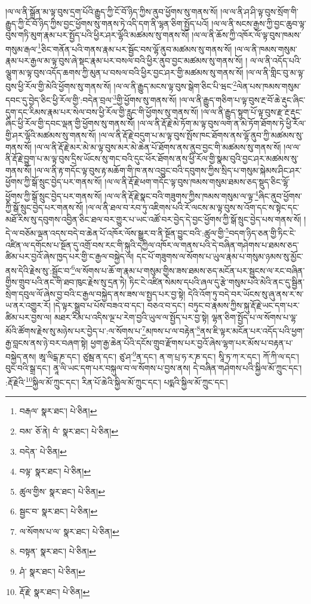 །ལ་ལ་ནི་སྒྲོན་མ་ལྟ་བུས་དྲག་པོའི་རྒྱུད་ཀྱི་ངོ་བོ་ཉིད་ཀྱིས་ནུབ་ཕྱོགས་སུ་གནས་སོ། །ལ་ལ་ནི་ཤ་ཤི་ལྟ་བུས་སྲོག་གི་རྒྱུད་ཀྱི་ངོ་བོ་ཉིད་ཀྱིས་བྱང་ཕྱོགས་སུ་གནས་ཏེ་འདི་དག་ནི་ལྷན་ཅིག་སྤྱོད་པའོ། །ལ་ལ་ནི་སངས་རྒྱས་ཀྱི་བྱང་ཆུབ་ལྟ་བུས་གཏི་མུག་རྣམ་པར་སྤྱོད་པའི་ཕྱིར་ཤར་ལྷོའི་མཚམས་སུ་གནས་སོ། །ལ་ལ་ནི་ཆོས་ཀྱི་འཁོར་ལོ་ལྟ་བུས་ཁམས་གསུམ་རྒལ་\footnote{བརྒལ་  སྣར་ཐང་།  པེ་ཅིན། }ཅིང་གནོན་པའི་གནས་རྣམ་པར་སྦྱོང་བས་ལྷོ་ནུབ་མཚམས་སུ་གནས་སོ། །ལ་ལ་ནི་ཁམས་གསུམ་རྣམ་པར་རྒྱལ་མ་ལྟ་བུས་ཞེ་སྡང་རྣམ་པར་བསལ་བའི་ཕྱིར་ནུབ་བྱང་མཚམས་སུ་གནས་སོ། །
ལ་ལ་ནི་འདོད་པའི་ལྕུག་མ་ལྟ་བུས་འདོད་ཆགས་ཀྱི་མུན་པ་བསལ་བའི་ཕྱིར་བྱང་ཤར་གྱི་མཚམས་སུ་གནས་སོ། །ལ་ལ་ནི་གླིང་བུ་མ་ལྟ་བུས་ཕྱི་རོལ་གྱི་མེའི་ཕྱོགས་སུ་གནས་སོ། །ལ་ལ་ནི་རྒྱུད་མངས་ལྟ་བུས་སྒེག་ཅིང་པི་ཝང་\footnote{བམ་  ཅོ་ནེ། བཾ་  སྣར་ཐང་།  པེ་ཅིན། }ལེན་པས་ཁམས་གསུམ་དབང་དུ་བྱེད་ཅིང་ཕྱི་རོལ་གྱི་:བདེན་བྲལ་\footnote{བདེན་  པེ་ཅིན། }གྱི་ཕྱོགས་སུ་གནས་སོ། །ལ་ལ་ནི་རྒྱུད་གཅིག་པ་ལྟ་བུས་རྔ་བོ་ཆེ་རྡུང་ཞིང་དུག་དང་རིམས་རྣམ་པར་སེལ་བས་ཕྱི་རོལ་གྱི་རླུང་གི་ཕྱོགས་སུ་གནས་སོ། །ལ་ལ་ནི་རྒྱུད་སྟུག་པོ་ལྟ་བུས་རྫ་རྔ་རྡུང་ཞིང་ཕྱི་རོལ་གྱི་དབང་ལྡན་གྱི་ཕྱོགས་སུ་གནས་སོ། །ལ་ལ་ནི་རྡོ་རྗེ་མེ་ཏོག་མ་ལྟ་བུས་ལག་ན་མེ་ཏོག་ཐོགས་ཏེ་ཕྱི་རོལ་གྱི་ཤར་ལྷོའི་མཚམས་སུ་གནས་སོ། །ལ་ལ་ནི་རྡོ་རྗེ་བདུག་པ་མ་ལྟ་བུས་སྤོས་ཁང་ཐོགས་ནས་ལྷོ་ནུབ་ཀྱི་མཚམས་སུ་གནས་སོ། །ལ་ལ་ནི་རྡོ་རྗེ་མར་མེ་མ་ལྟ་བུས་མར་མེ་ཆེན་པོ་ཐོགས་ནས་ནུབ་བྱང་གི་མཚམས་སུ་གནས་སོ། །ལ་ལ་ནི་རྡོ་རྗེ་བྱུག་པ་མ་ལྟ་བུས་དྲིས་ཡོངས་སུ་གང་བའི་དུང་ཕོར་ཐོགས་ནས་ཕྱི་རོལ་གྱི་སྣམ་བུའི་བྱང་ཤར་མཚམས་སུ་གནས་སོ། །ལ་ལ་ནི་རྟ་གདོང་ལྟ་བུས་རྟ་མཆོག་གི་ཁ་ནས་འབྱུང་བའི་དབུགས་ཀྱིས་སྲིད་པ་གསུམ་སྐེམས་ཤིང་ཤར་ཕྱོགས་ཀྱི་སྒོ་སྲུང་བྱེད་པར་གནས་སོ། །ལ་ལ་ནི་རྡོ་རྗེ་ཕག་གདོང་ལྟ་བུས་ཁམས་གསུམ་ཐམས་ཅད་སྡུད་ཅིང་ལྷོ་ཕྱོགས་ཀྱི་སྒོ་སྲུང་བྱེད་པར་གནས་སོ། །ལ་ལ་ནི་རྡོ་རྗེ་སྣང་བའི་གཟུགས་ཀྱིས་ཁམས་གསུམ་ལ་ལྟ་\footnote{བལྟ་  སྣར་ཐང་།  པེ་ཅིན། }ཞིང་ནུབ་ཕྱོགས་ཀྱི་སྒོ་སྲུང་བྱེད་པར་གནས་སོ། །ལ་ལ་ནི་ཐལ་བ་རབ་ཏུ་འཇིགས་པའི་རོ་ལངས་མ་ལྟ་བུས་ས་འོག་དང་ས་སྟེང་དང་མཐོ་རིས་སུ་དབུགས་འབྱིན་ཅིང་ཐལ་བར་གྱུར་པ་ཡང་འཚོ་བར་བྱེད་དེ་བྱང་ཕྱོགས་ཀྱི་སྒོ་སྲུང་བྱེད་པས་གནས་སོ། །དེ་ལ་བཅོམ་ལྡན་འདས་བདེ་བ་ཆེན་པོ་འཁོར་ལོས་སྒྱུར་བ་ནི་སྔོན་བྱུང་བའི་:ཚུལ་གྱི་\footnote{ཚུལ་གྱིས་  སྣར་ཐང་།  པེ་ཅིན། }བདག་ཉིད་ཅན་གྱི་ཏིང་ངེ་འཛིན་ལ་དགོངས་པ་སྔོན་དུ་འགྲོ་བས་རང་གི་སྐུའི་དཀྱིལ་འཁོར་ལ་གནས་པའི་དེ་བཞིན་གཤེགས་པ་ཐམས་ཅད་ཚིམ་པར་བྱའོ་ཞེས་ཁྱད་པར་གྱི་ང་རྒྱལ་བསྐྱེད་ལ། དང་པོ་གཟུགས་ལ་སོགས་པ་ཡུལ་རྣམ་པ་གསུམ་ཉམས་སུ་མྱོང་ནས་དེའི་རྗེས་སུ་:སྦྱོང་བ་\footnote{སྦྱང་བ་  སྣར་ཐང་།  པེ་ཅིན། }ལ་སོགས་པ་ཆོ་ག་རྣམ་པ་གསུམ་གྱིས་ཟས་ཐམས་ཅད་མངོན་པར་སྦྱངས་ལ་རང་བཞིན་གྱིས་གྲུབ་པའི་ནང་གི་ཐབ་ཁུང་རྗེས་སུ་དྲན་ཏེ། ཏིང་ངེ་འཛིན་སེམས་དཔའི་ཞལ་དུ་རྩེ་གསུམ་པའི་མེའི་ནང་དུ་སྦྱིན་སྲེག་དབུལ་ལོ་ཞེས་བྱ་བའི་ང་རྒྱལ་བསྐྱེད་ནས་ཟས་ལ་སྤྱད་པར་བྱ་སྟེ། དེའི་འོག་ཏུ་བདེ་བར་ཡོངས་སུ་ཞུ་ནས་ར་ས་ཡ་ནར་འགྱུར་རོ། །དེ་ལྟར་སྒྲུབ་པ་པོས་བཟའ་བ་དང་། བཅའ་བ་དང་། བཏུང་བ་རྣམས་ཀྱིས་སྐུ་རྡོ་རྗེ་ཡང་དག་པར་ཚིམ་པར་བྱས་ལ། མཐར་རིམ་པ་འདིས་ལྔ་པ་རེག་བྱའི་ཡུལ་ལ་སྤྱོད་པར་བྱ་སྟེ། ལྷན་ཅིག་སྤྱོད་པ་ལ་སོགས་པ་ལྷ་མོའི་ཚོགས་རྗེས་སུ་མཉེས་པར་བྱེད་པ་:ལ་སོགས་པ་\footnote{ལ་སོགས་པ་ལ་  སྣར་ཐང་།  པེ་ཅིན། }མཁས་པ་ལ་བརྟེན་\footnote{བསྟན་  སྣར་ཐང་།  པེ་ཅིན། }ནས་ཇི་ལྟར་མངོན་པར་འདོད་པའི་ཕྱག་རྒྱ་བླངས་ནས་ཉེ་བར་བཞག་སྟེ། ཕྱག་རྒྱ་ཆེན་པོའི་དངོས་གྲུབ་རྫོགས་པར་བྱའོ་ཞེས་ལྷག་པར་མོས་པ་བརྟན་པ་བསྐྱེད་ནས། ཨཱ་ལིངྒ་ཎ་དང་། ཙུམྦ་ན་དང་། ཙུ་ཤ་\footnote{ཤཾ་  སྣར་ཐང་།  པེ་ཅིན། }ན་དང་། ན་ག་པྲ་ཧ་ར་ཎ་དང་། སཱི་ཏ་ཀ་ར་དང་། ཀོ་ཀི་ལ་དང་། བུང་བའི་སྒྲ་དང་། ནཱ་ལི་ཡང་དག་པར་བསྐུལ་བ་ལ་སོགས་པ་བྱས་ནས། དེ་བཞིན་གཤེགས་པའི་སྐྱིལ་མོ་ཀྲུང་དང་། :རྡོ་རྗེའི་\footnote{རྡོ་རྗེ་  སྣར་ཐང་།  པེ་ཅིན། }སྐྱིལ་མོ་ཀྲུང་དང་། རིན་པོ་ཆེའི་སྐྱིལ་མོ་ཀྲུང་དང་། པདྨའི་སྐྱིལ་མོ་ཀྲུང་དང་། 